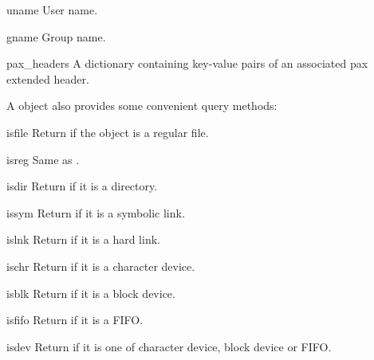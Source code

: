 \begin{memberdesc}{uname}
    User name.
\end{memberdesc}

\begin{memberdesc}{gname}
    Group name.
\end{memberdesc}

\begin{memberdesc}{pax_headers}
    A dictionary containing key-value pairs of an associated pax
    extended header.
\end{memberdesc}

A  object also provides some convenient query methods:

\begin{methoddesc}{isfile}{}
    Return  if the  object is a regular
    file.
\end{methoddesc}

\begin{methoddesc}{isreg}{}
    Same as .
\end{methoddesc}

\begin{methoddesc}{isdir}{}
    Return  if it is a directory.
\end{methoddesc}

\begin{methoddesc}{issym}{}
    Return  if it is a symbolic link.
\end{methoddesc}

\begin{methoddesc}{islnk}{}
    Return  if it is a hard link.
\end{methoddesc}

\begin{methoddesc}{ischr}{}
    Return  if it is a character device.
\end{methoddesc}

\begin{methoddesc}{isblk}{}
    Return  if it is a block device.
\end{methoddesc}

\begin{methoddesc}{isfifo}{}
    Return  if it is a FIFO.
\end{methoddesc}

\begin{methoddesc}{isdev}{}
    Return  if it is one of character device, block
    device or FIFO.
\end{methoddesc}

